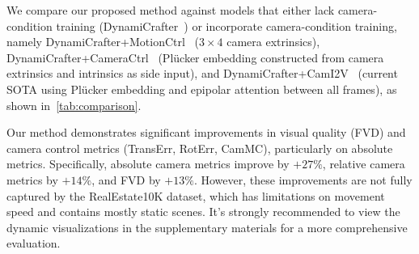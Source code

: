We compare our proposed method against models that either lack camera-condition training (DynamiCrafter~\cite{Xing2023}) or incorporate camera-condition training, namely DynamiCrafter+MotionCtrl~\cite{Wang2024Motionctrl} (\(3\times4\) camera extrinsics), DynamiCrafter+CameraCtrl~\cite{He2024Cameractrl} (Plücker embedding constructed from camera extrinsics and intrinsics as side input), and DynamiCrafter+CamI2V~\cite{zheng2024cami2v} (current SOTA using Plücker embedding and epipolar attention between all frames), as shown in~\cref{tab:comparison}.

Our method demonstrates significant improvements in visual quality (FVD) and camera control metrics (TransErr, RotErr, CamMC), particularly on absolute metrics. Specifically, absolute camera metrics improve by \(+27\%\), relative camera metrics by \(+14\%\), and FVD by \(+13\%\).
However, these improvements are not fully captured by the RealEstate10K dataset, which has limitations on movement speed and contains mostly static scenes.
It's strongly recommended to view the dynamic visualizations in the supplementary materials for a more comprehensive evaluation.






